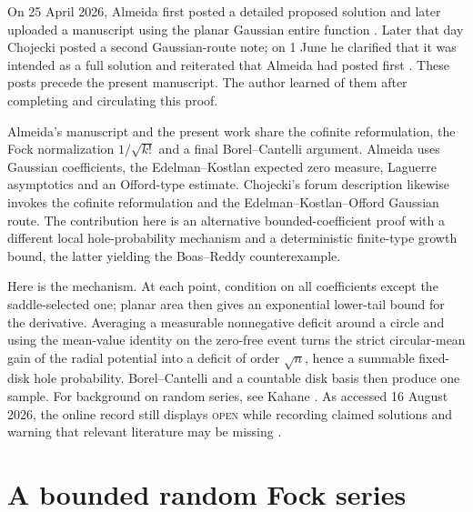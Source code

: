 \documentclass[plain]{baustms}
\theoremstyle{cupthm}
\begin{document}
On 25 April 2026, Almeida first posted a detailed proposed solution and later
uploaded a manuscript using the planar Gaussian entire function
\cite{AlmeidaForum2026,Almeida2026}. Later that day Chojecki posted a second
Gaussian-route note; on 1 June he clarified that it was intended as a full
solution and reiterated that Almeida had posted first
\cite{ChojeckiForum2026}. These posts precede the present manuscript. The
author learned of them after completing and circulating this proof.

Almeida's manuscript and the present work share the cofinite reformulation,
the Fock normalization $1/\sqrt{k!}$ and a final Borel--Cantelli argument.
Almeida uses Gaussian coefficients, the Edelman--Kostlan expected zero
measure, Laguerre asymptotics and an Offord-type estimate. Chojecki's forum
description likewise invokes the cofinite reformulation and the
Edelman--Kostlan--Offord Gaussian route. The contribution here is an
alternative bounded-coefficient proof with a different local hole-probability
mechanism and a deterministic finite-type growth bound, the latter yielding
the Boas--Reddy counterexample.

Here is the mechanism. At each point, condition on all coefficients except the
saddle-selected one; planar area then gives an exponential lower-tail bound
for the derivative. Averaging a measurable nonnegative deficit around a circle
and using the mean-value identity on the zero-free event turns the strict
circular-mean gain of the radial potential into a deficit of order $\sqrt n$,
hence a summable fixed-disk hole probability. Borel--Cantelli
\cite[Section~2.3]{Durrett} and a countable disk basis then produce one sample.
For background on random series, see Kahane \cite{Kahane}. As accessed 16
August 2026, the online record still displays \textsc{open} while recording
claimed solutions and warning that relevant literature may be missing
\cite{Bloom906,AlmeidaForum2026,ChojeckiForum2026}.

\section{A bounded random Fock series}\label{sec:fock}
\end{document}
